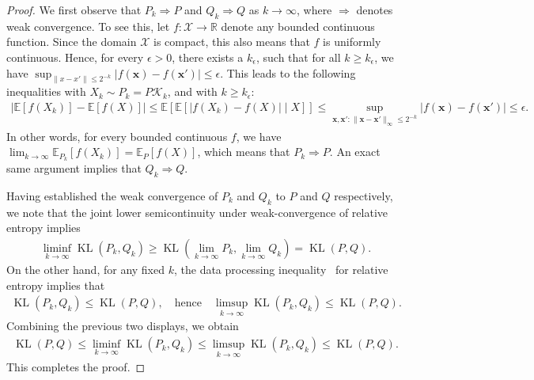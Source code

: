 \documentclass{article}
\theoremstyle{plain}
\theoremstyle{definition}
\newcommand{\KL}{\operatorname{KL}}
\newcommand{\calX}{\mathcal X}
\newcommand{\calK}{\mathcal{K}}
\newcommand{\xvec}{\mathbf{x}}
\newcommand{\qtext}[1]{\quad \text{#1} \quad}
\begin{document}
\begin{proof}
We first observe that $P_k \Longrightarrow P$ and $Q_k \Longrightarrow Q$  as $k \to \infty$,  where $\Longrightarrow$ denotes weak convergence. To see this, let $f:\calX \to \mathbb{R}$ denote any bounded continuous function. Since the domain $\calX$ is compact, this also means that $f$ is uniformly continuous.  Hence, for every $\epsilon>0$, there exists a $k_\epsilon$, such that for all $k \geq k_\epsilon$, we have $\sup_{\|x-x'\|\leq 2^{-k}}|f(\xvec)-f(\xvec')|\leq \epsilon$. This leads to the following inequalities with $X_k \sim P_k =  P\calK_k$, and with $k \ge k_\epsilon$: 
\begin{align}
    |\mathbb{E}[f(X_k)] - \mathbb{E}[f(X)]| \leq \mathbb{E}\left[ \mathbb{E}\left[ |f(X_k) - f(X)| \mid  X \right] \right] \leq \sup_{\xvec, \xvec': \|\xvec-\xvec'\|_\infty \leq 2^{-k}} |f(\xvec) - f(\xvec')| \leq \epsilon. 
\end{align}
In other words, for every bounded continuous $f$, we have $\lim_{k \to \infty} \mathbb{E}_{P_k}[f(X_k)] = \mathbb{E}_{P}[f(X)]$,
which means that $P_k \Longrightarrow P$. An exact same argument implies that $Q_k \Rightarrow Q$.  

Having established the weak convergence of $P_k$ and $Q_k$ to $P$ and $Q$ respectively, we note that  the joint lower semicontinuity under weak-convergence of relative entropy  implies 
\begin{align}
    \liminf_{k \to \infty} \KL(P_k,  Q_k)  \geq \KL(\lim_{k \to \infty} P_k, \lim_{k \to \infty} Q_k) = \KL(P, Q). 
\end{align}
On the other hand, for any fixed $k$, the data processing inequality~\citep[Theorem 2.17]{polyanskiy2025information} for relative entropy implies that 
\begin{align}
    \KL(P_k, Q_k) \leq \KL(P, Q), \qtext{hence} \limsup_{k \to \infty} \KL(P_k, Q_k) \leq \KL(P, Q). 
\end{align}
Combining the previous two displays, we obtain 
\begin{align}
    \KL(P, Q) \leq \liminf_{k \to \infty} \KL(P_k, Q_k) \leq \limsup_{k \to \infty} \KL(P_k, Q_k) \leq \KL(P, Q). 
\end{align}
This completes the proof. 
\end{proof}
\end{document}
